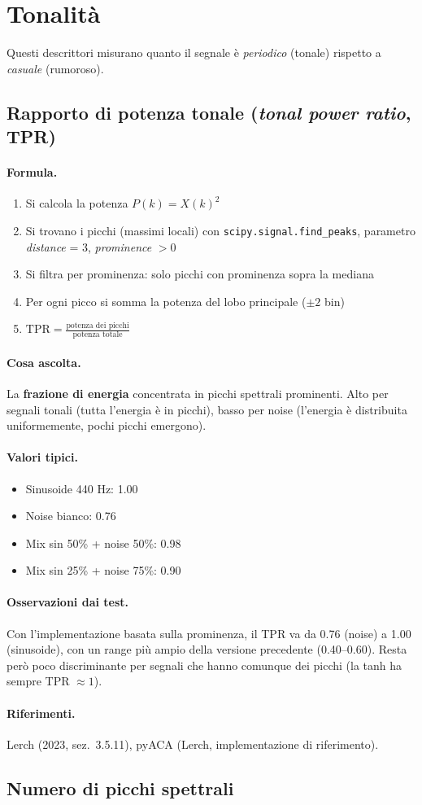 \documentclass[a4paper,11pt]{article}
\newcommand{\desc}[1]{\subsection{#1}}
\newcommand{\formula}{\paragraph{Formula.}}
\newcommand{\ascolta}{\paragraph{Cosa ascolta.}}
\newcommand{\range}{\paragraph{Valori tipici.}}
\newcommand{\rif}{\paragraph{Riferimenti.}}
\newcommand{\oss}{\paragraph{Osservazioni dai test.}}
\begin{document}
\section{Tonalità}

Questi descrittori misurano quanto il segnale è \emph{periodico}
(tonale) rispetto a \emph{casuale} (rumoroso).

\desc{Rapporto di potenza tonale (\emph{tonal power ratio}, TPR)}

\formula
\begin{enumerate}[nosep]
  \item Si calcola la potenza $P(k) = X(k)^2$
  \item Si trovano i picchi (massimi locali) con \texttt{scipy.signal.find\_peaks},
        parametro \emph{distance} = 3, \emph{prominence} $> 0$
  \item Si filtra per prominenza: solo picchi con prominenza sopra la mediana
  \item Per ogni picco si somma la potenza del lobo principale ($\pm 2$ bin)
  \item $\text{TPR} = \frac{\text{potenza dei picchi}}{\text{potenza totale}}$
\end{enumerate}

\ascolta
La \textbf{frazione di energia} concentrata in picchi spettrali prominenti.
Alto per segnali tonali (tutta l'energia è in picchi), basso per noise
(l'energia è distribuita uniformemente, pochi picchi emergono).

\range
\begin{itemize}[nosep]
  \item Sinusoide 440 Hz: 1.00
  \item Noise bianco: 0.76
  \item Mix sin 50\% + noise 50\%: 0.98
  \item Mix sin 25\% + noise 75\%: 0.90
\end{itemize}

\oss Con l'implementazione basata sulla prominenza, il TPR va da 0.76
(noise) a 1.00 (sinusoide), con un range più ampio della versione
precedente (0.40--0.60). Resta però poco discriminante per segnali
che hanno comunque dei picchi (la tanh ha sempre TPR $\approx 1$).

\rif Lerch (2023, sez.~3.5.11), pyACA (Lerch, implementazione di riferimento).

\desc{Numero di picchi spettrali}
\end{document}
